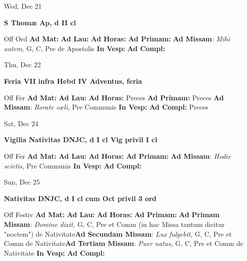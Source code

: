 \documentclass[10pt]{article}
\begin{document}
\begin{minipage}{3.5in}
\vspace{2em}\begin{center}
Wed, Dec 21
\end{center}\textbf{ \large S Thomæ Ap, \textnormal{\normalsize d II cl}}
\begin{justify}
Off Ord
\textbf{Ad Mat: }
\textbf{Ad Lau: }
\textbf{Ad Horas: }
\textbf{Ad Primam: }
\textbf{Ad Missam}: \textit{Mihi autem,} G, C, Pre de Apostolis
\textbf{In Vesp: }
\textbf{Ad Compl: }\end{justify}
\end{minipage}



\begin{minipage}{3.5in}
\vspace{2em}\begin{center}
Thu, Dec 22
\end{center}\textbf{ \large Feria VII infra Hebd IV Adventus, \textnormal{\normalsize feria}}
\begin{justify}
Off Fer
\textbf{Ad Mat: }
\textbf{Ad Lau: }
\textbf{Ad Horas: }Preces
\textbf{Ad Primam: }Preces
\textbf{Ad Missam}: \textit{Rorate cæli,} Pre Communis
\textbf{In Vesp: }
\textbf{Ad Compl: }Preces\end{justify}
\end{minipage}



\begin{minipage}{3.5in}
\vspace{2em}\begin{center}
Sat, Dec 24
\end{center}\textbf{ \large Vigilia Nativitas DNJC, \textnormal{\normalsize d I cl Vig privil I cl}}
\begin{justify}
Off Fer
\textbf{Ad Mat: }
\textbf{Ad Lau: }
\textbf{Ad Horas: }
\textbf{Ad Primam: }
\textbf{Ad Missam}: \textit{Hodie scietis,} Pre Communis
\textbf{In Vesp: }
\textbf{Ad Compl: }\end{justify}
\end{minipage}



\begin{minipage}{3.5in}
\vspace{2em}\begin{center}
Sun, Dec 25
\end{center}\textbf{ \large Nativitas DNJC, \textnormal{\normalsize d I cl cum Oct privil 3 ord}}
\begin{justify}
Off Festiv
\textbf{Ad Mat: }
\textbf{Ad Lau: }
\textbf{Ad Horas: }
\textbf{Ad Primam: }
\textbf{Ad Primam Missam}: \textit{Domine dixit,} G, C, Pre et Comm (in hac Missa tantum dicitur "noctem") de Nativitate\textbf{Ad Secundam Missam}: \textit{Lux fulgebit,} G, C, Pre et Comm de Nativitate\textbf{Ad Tertiam Missam}: \textit{Puer natus,} G, C, Pre et Comm de Nativitate
\textbf{In Vesp: }
\textbf{Ad Compl: }\end{justify}
\end{minipage}
\end{document}
